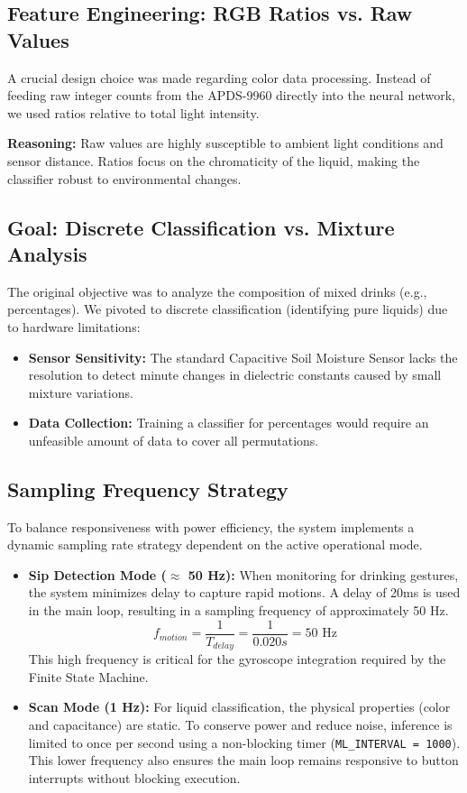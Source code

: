 \documentclass[12pt]{article}
\begin{document}
\subsection{Feature Engineering: RGB Ratios vs. Raw Values}
A crucial design choice was made regarding color data processing. Instead of feeding raw integer counts from the APDS-9960 directly into the neural network, we used ratios relative to total light intensity.

\textbf{Reasoning:} Raw values are highly susceptible to ambient light conditions and sensor distance. Ratios focus on the chromaticity of the liquid, making the classifier robust to environmental changes.

\subsection{Goal: Discrete Classification vs. Mixture Analysis}
The original objective was to analyze the composition of mixed drinks (e.g., percentages). We pivoted to discrete classification (identifying pure liquids) due to hardware limitations:
\begin{itemize}
    \item \textbf{Sensor Sensitivity:} The standard Capacitive Soil Moisture Sensor lacks the resolution to detect minute changes in dielectric constants caused by small mixture variations.
    \item \textbf{Data Collection:} Training a classifier for percentages would require an unfeasible amount of data to cover all permutations.
\end{itemize}

\subsection{Sampling Frequency Strategy}
To balance responsiveness with power efficiency, the system implements a dynamic sampling rate strategy dependent on the active operational mode.

\begin{itemize}
    \item \textbf{Sip Detection Mode ($\approx$ 50 Hz):} 
    When monitoring for drinking gestures, the system minimizes delay to capture rapid motions. A delay of 20ms is used in the main loop, resulting in a sampling frequency of approximately 50 Hz.
    \begin{equation}
        f_{motion} = \frac{1}{T_{delay}} = \frac{1}{0.020s} = 50 \text{ Hz}
    \end{equation}
    This high frequency is critical for the gyroscope integration required by the Finite State Machine.

    \item \textbf{Scan Mode (1 Hz):} 
    For liquid classification, the physical properties (color and capacitance) are static. To conserve power and reduce noise, inference is limited to once per second using a non-blocking timer (\texttt{ML\_INTERVAL = 1000}). This lower frequency also ensures the main loop remains responsive to button interrupts without blocking execution.
\end{itemize}
\end{document}
